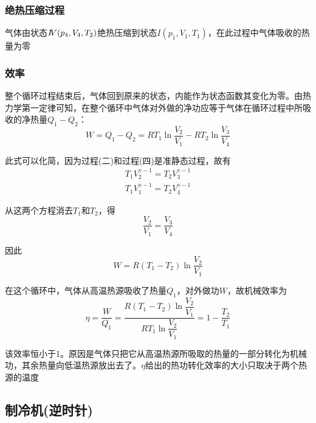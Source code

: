 \documentclass[oneside]{ctexbook}
\begin{document}
\subsubsection{绝热压缩过程}

气体由状态\(I\hspace{-0.08cm}V(p_4,V_4,T_2)\)绝热压缩到状态\(I(p_1,V_1,T_1)\)，在此过程中气体吸收的热量为零

\subsubsection{效率}

整个循环过程结束后，气体回到原来的状态，内能作为状态函数其变化为零。由热力学第一定律可知，在整个循环中气体对外做的净功应等于气体在循环过程中所吸收的净热量\(Q_1-Q_2\)：
\begin{equation}
W=Q_1-Q_2=RT_1\ln\dfrac{V_2}{V_1}-RT_2\ln\dfrac{V_3}{V_4}
\end{equation}

此式可以化简，因为过程(二)和过程(四)是准静态过程，故有
\begin{equation*}
    \begin{aligned}
        T_1V_2^{\gamma-1}=T_2V_3^{\gamma-1}\\
        T_1V_1^{\gamma-1}=T_2V_4^{\gamma-1}
    \end{aligned}
\end{equation*}

从这两个方程消去\(T_1\)和\(T_2\)，得
\begin{equation}
\dfrac{V_2}{V_1}=\dfrac{V_3}{V_4}
\end{equation}

因此
\begin{equation}
W=R(T_1-T_2)\ln\dfrac{V_2}{V_1}
\end{equation}

在这个循环中，气体从高温热源吸收了热量\(Q_1\)，对外做功\(W\)，故机械效率为
\begin{equation}
\eta=\dfrac{W}{Q_1}=\dfrac{R(T_1-T_2)\ln\dfrac{V_2}{V_1}}{RT_1\ln\dfrac{V_2}{V_1}}=1-\dfrac{T_2}{T_1}
\end{equation}

该效率恒小于1。原因是气体只把它从高温热源所吸取的热量的一部分转化为机械功，其余热量向低温热源放出去了。\(\eta\)给出的热功转化效率的大小只取决于两个热源的温度

\subsection{制冷机(逆时针)}
\end{document}
